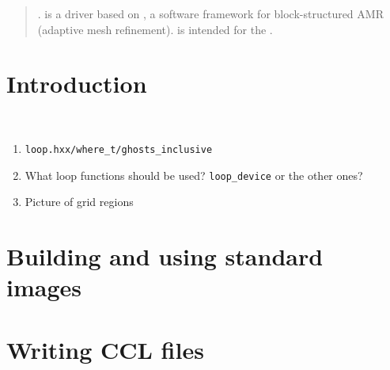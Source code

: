 \begin{abstract}

. \CarpetX\space is a \href{https://www.cactuscode.org/index.html}{\Cactus} driver based on \href{https://amrex-codes.github.io/}{\AMReX}, a software framework for block-structured AMR (adaptive mesh refinement). \CarpetX\space is intended for the \href{https://einsteintoolkit.org/}{\ETK}.

\end{abstract}

\newpage

\tableofcontents

\newpage


\section{Introduction}
\label{sec:intro}

\\

\begin{enumerate}
    \item \texttt{loop.hxx/where\_t/ghosts\_inclusive}
    \item What loop functions should be used? \texttt{loop\_device} or the other ones?
    \item Picture of grid regions
\end{enumerate}

\section{Building and using standard images}
\label{sec:std_imgs}

\section{Writing CCL files}
\label{sec:ccl_files}


